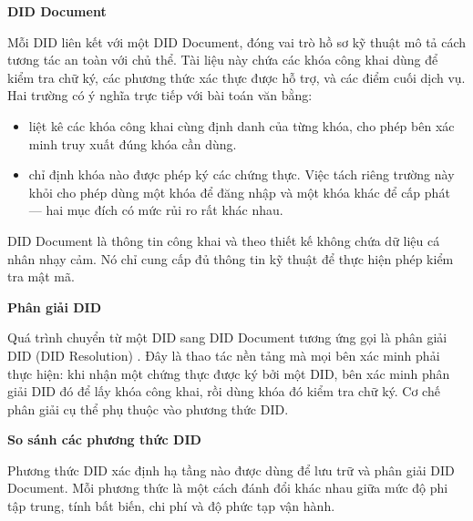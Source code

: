 \noindent \textbf{DID Document}

Mỗi DID liên kết với một DID Document, đóng vai trò hồ sơ kỹ thuật mô tả cách tương tác an toàn với chủ thể. Tài liệu này chứa các khóa công khai dùng để kiểm tra chữ ký, các phương thức xác thực được hỗ trợ, và các điểm cuối dịch vụ. Hai trường có ý nghĩa trực tiếp với bài toán văn bằng:

\begin{itemize}
    \item {} liệt kê các khóa công khai cùng định danh của từng khóa, cho phép bên xác minh truy xuất đúng khóa cần dùng.
    \item {} chỉ định khóa nào được phép ký các chứng thực. Việc tách riêng trường này khỏi  cho phép dùng một khóa để đăng nhập và một khóa khác để cấp phát --- hai mục đích có mức rủi ro rất khác nhau.
\end{itemize}

DID Document là thông tin công khai và theo thiết kế không chứa dữ liệu cá nhân nhạy cảm. Nó chỉ cung cấp đủ thông tin kỹ thuật để thực hiện phép kiểm tra mật mã.

\noindent \textbf{Phân giải DID}

Quá trình chuyển từ một DID sang DID Document tương ứng gọi là phân giải DID (DID Resolution) \cite{W3C_DIDResolution}. Đây là thao tác nền tảng mà mọi bên xác minh phải thực hiện: khi nhận một chứng thực được ký bởi một DID, bên xác minh phân giải DID đó để lấy khóa công khai, rồi dùng khóa đó kiểm tra chữ ký. Cơ chế phân giải cụ thể phụ thuộc vào phương thức DID.

\noindent \textbf{So sánh các phương thức DID}

Phương thức DID xác định hạ tầng nào được dùng để lưu trữ và phân giải DID Document. Mỗi phương thức là một cách đánh đổi khác nhau giữa mức độ phi tập trung, tính bất biến, chi phí và độ phức tạp vận hành.

